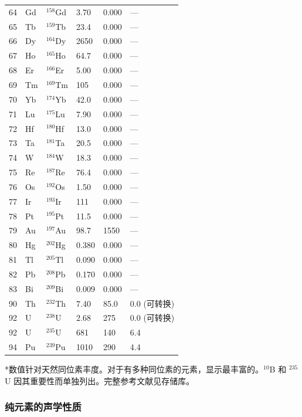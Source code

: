 \documentclass[12pt,a4paper]{article}
\begin{document}
\begin{longtable}{p{0.8cm}p{1.2cm}p{2.0cm}p{2.5cm}p{2.5cm}p{2.5cm}}
		64 & Gd & \(^{158}\)Gd & 3.70 & 0.000 & --- \\
		65 & Tb & \(^{159}\)Tb & 23.4 & 0.000 & --- \\
		66 & Dy & \(^{164}\)Dy & 2650 & 0.000 & --- \\
		67 & Ho & \(^{165}\)Ho & 64.7 & 0.000 & --- \\
		68 & Er & \(^{166}\)Er & 5.00 & 0.000 & --- \\
		69 & Tm & \(^{169}\)Tm & 105 & 0.000 & --- \\
		70 & Yb & \(^{174}\)Yb & 42.0 & 0.000 & --- \\
		71 & Lu & \(^{175}\)Lu & 7.90 & 0.000 & --- \\
		72 & Hf & \(^{180}\)Hf & 13.0 & 0.000 & --- \\
		73 & Ta & \(^{181}\)Ta & 20.5 & 0.000 & --- \\
		74 & W  & \(^{184}\)W & 18.3 & 0.000 & --- \\
		75 & Re & \(^{187}\)Re & 76.4 & 0.000 & --- \\
		76 & Os & \(^{192}\)Os & 1.50 & 0.000 & --- \\
		77 & Ir & \(^{193}\)Ir & 111 & 0.000 & --- \\
		78 & Pt & \(^{195}\)Pt & 11.5 & 0.000 & --- \\
		79 & Au & \(^{197}\)Au & 98.7 & 1550 & --- \\
		80 & Hg & \(^{202}\)Hg & 0.380 & 0.000 & --- \\
		81 & Tl & \(^{205}\)Tl & 0.090 & 0.000 & --- \\
		82 & Pb & \(^{208}\)Pb & 0.170 & 0.000 & --- \\
		83 & Bi & \(^{209}\)Bi & 0.009 & 0.000 & --- \\
		90 & Th & \(^{232}\)Th & 7.40 & 85.0 & 0.0 (可转换) \\
		92 & U  & \(^{238}\)U & 2.68 & 275 & 0.0 (可转换) \\
		92 & U  & \(^{235}\)U & 681 & 140 & 6.4 \\
		94 & Pu & \(^{239}\)Pu & 1010 & 290 & 4.4 \\
		\bottomrule
	\end{longtable}
	*数值针对天然同位素丰度。对于有多种同位素的元素，显示最丰富的。\(^{10}\)B 和 \(^{235}\)U 因其重要性而单独列出。完整参考文献见存储库。
	
	\subsubsection{纯元素的声学性质}
	\label{subsec:acoustic-properties-func}
	
\end{document}
